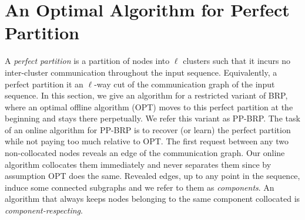 \documentclass[manuscript,screen=true]{acmart}
\newcommand{\OBRP}{BRP}
\newcommand{\PPOBRP}{PP-BRP}
\newcommand\mahmoud[1]{\color{green}\textbf{\\ Mahmoud: #1}\\\color{black}}
\newcommand\maciek[1]{\color{brown}\textbf{\\ Maciek: #1}\color{black}}
\begin{document}
\section{An Optimal Algorithm for Perfect Partition}	\label{sec:ppl}


A \emph{perfect partition} is a partition of nodes into $\ell$ clusters
such that it incurs no inter-cluster communication throughout the input sequence.
Equivalently, a perfect partition it an $\ell$-way cut of the communication graph of the input sequence.
In this section,
we give an algorithm for a restricted variant of  \OBRP{},
where an optimal offline algorithm (OPT) moves to this perfect partition
at the beginning and stays there perpetually.
We refer this variant as \PPOBRP{}.
The task of an online algorithm for \PPOBRP{} is to recover (or learn) the perfect partition while not paying too much relative to OPT.
%
The first request between any two non-collocated nodes reveals an edge of the communication graph.
Our online algorithm collocates them immediately and never separates them since by assumption OPT does the same.
Revealed edges, up to any point in the sequence,
induce some connected subgraphs and we refer to them as \emph{components}.
An algorithm that always  keeps nodes belonging to the same component collocated is \emph{component-respecting}.
\end{document}
